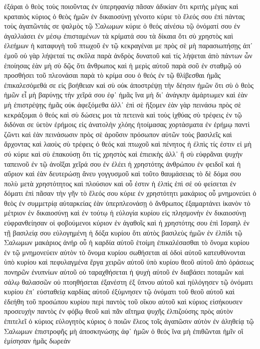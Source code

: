 ἐξάραι ὁ θεὸς τοὺς ποιοῦντας ἐν ὑπερηφανίᾳ πᾶσαν ἀδικίαν ὅτι κριτὴς μέγας καὶ κραταιὸς κύριος ὁ θεὸς ἡμῶν ἐν δικαιοσύνῃ
γένοιτο κύριε τὸ ἔλεός σου ἐπὶ πάντας τοὺς ἀγαπῶντάς σε
ψαλμὸς τῷ Σαλωμων
κύριε ὁ θεός αἰνέσω τῷ ὀνόματί σου ἐν ἀγαλλιάσει ἐν μέσῳ ἐπισταμένων τὰ κρίματά σου τὰ δίκαια
ὅτι σὺ χρηστὸς καὶ ἐλεήμων ἡ καταφυγὴ τοῦ πτωχοῦ ἐν τῷ κεκραγέναι με πρὸς σὲ μὴ παρασιωπήσῃς ἀπ᾽ ἐμοῦ
οὐ γὰρ λήψεταί τις σκῦλα παρὰ ἀνδρὸς δυνατοῦ καὶ τίς λήψεται ἀπὸ πάντων ὧν ἐποίησας ἐὰν μὴ σὺ δῷς
ὅτι ἄνθρωπος καὶ ἡ μερὶς αὐτοῦ παρὰ σοῦ ἐν σταθμῷ οὐ προσθήσει τοῦ πλεονάσαι παρὰ τὸ κρίμα σου ὁ θεός
ἐν τῷ θλίβεσθαι ἡμᾶς ἐπικαλεσόμεθά σε εἰς βοήθειαν καὶ σὺ οὐκ ἀποστρέψῃ τὴν δέησιν ἡμῶν ὅτι σὺ ὁ θεὸς ἡμῶν εἶ
μὴ βαρύνῃς τὴν χεῖρά σου ἐφ᾽ ἡμᾶς ἵνα μὴ δι᾽ ἀνάγκην ἁμάρτωμεν
καὶ ἐὰν μὴ ἐπιστρέψῃς ἡμᾶς οὐκ ἀφεξόμεθα ἀλλ᾽ ἐπὶ σὲ ἥξομεν
ἐὰν γὰρ πεινάσω πρὸς σὲ κεκράξομαι ὁ θεός καὶ σὺ δώσεις μοι
τὰ πετεινὰ καὶ τοὺς ἰχθύας σὺ τρέφεις ἐν τῷ διδόναι σε ὑετὸν ἐρήμοις εἰς ἀνατολὴν χλόης
ἡτοίμασας χορτάσματα ἐν ἐρήμῳ παντὶ ζῶντι καὶ ἐὰν πεινάσωσιν πρὸς σὲ ἀροῦσιν πρόσωπον αὐτῶν
τοὺς βασιλεῖς καὶ ἄρχοντας καὶ λαοὺς σὺ τρέφεις ὁ θεός καὶ πτωχοῦ καὶ πένητος ἡ ἐλπὶς τίς ἐστιν εἰ μὴ σύ κύριε
καὶ σὺ ἐπακούσῃ ὅτι τίς χρηστὸς καὶ ἐπιεικὴς ἀλλ᾽ ἢ σὺ εὐφρᾶναι ψυχὴν ταπεινοῦ ἐν τῷ ἀνοῖξαι χεῖρά σου ἐν ἐλέει
ἡ χρηστότης ἀνθρώπου ἐν φειδοῖ καὶ ἡ αὔριον καὶ ἐὰν δευτερώσῃ ἄνευ γογγυσμοῦ καὶ τοῦτο θαυμάσειας
τὸ δὲ δόμα σου πολὺ μετὰ χρηστότητος καὶ πλούσιον καὶ οὗ ἐστιν ἡ ἐλπὶς ἐπὶ σέ οὐ φείσεται ἐν δόματι
ἐπὶ πᾶσαν τὴν γῆν τὸ ἔλεός σου κύριε ἐν χρηστότητι
μακάριος οὗ μνημονεύει ὁ θεὸς ἐν συμμετρίᾳ αὐταρκείας ἐὰν ὑπερπλεονάσῃ ὁ ἄνθρωπος ἐξαμαρτάνει
ἱκανὸν τὸ μέτριον ἐν δικαιοσύνῃ καὶ ἐν τούτῳ ἡ εὐλογία κυρίου εἰς πλησμονὴν ἐν δικαιοσύνῃ
εὐφρανθείησαν οἱ φοβούμενοι κύριον ἐν ἀγαθοῖς καὶ ἡ χρηστότης σου ἐπὶ Ισραηλ ἐν τῇ βασιλείᾳ σου
εὐλογημένη ἡ δόξα κυρίου ὅτι αὐτὸς βασιλεὺς ἡμῶν
ἐν ἐλπίδι τῷ Σαλωμων
μακάριος ἀνήρ οὗ ἡ καρδία αὐτοῦ ἑτοίμη ἐπικαλέσασθαι τὸ ὄνομα κυρίου ἐν τῷ μνημονεύειν αὐτὸν τὸ ὄνομα κυρίου σωθήσεται
αἱ ὁδοὶ αὐτοῦ κατευθύνονται ὑπὸ κυρίου καὶ πεφυλαγμένα ἔργα χειρῶν αὐτοῦ ὑπὸ κυρίου θεοῦ αὐτοῦ
ἀπὸ ὁράσεως πονηρῶν ἐνυπνίων αὐτοῦ οὐ ταραχθήσεται ἡ ψυχὴ αὐτοῦ ἐν διαβάσει ποταμῶν καὶ σάλῳ θαλασσῶν οὐ πτοηθήσεται
ἐξανέστη ἐξ ὕπνου αὐτοῦ καὶ ηὐλόγησεν τῷ ὀνόματι κυρίου ἐπ᾽ εὐσταθείᾳ καρδίας αὐτοῦ ἐξύμνησεν τῷ ὀνόματι τοῦ θεοῦ αὐτοῦ
καὶ ἐδεήθη τοῦ προσώπου κυρίου περὶ παντὸς τοῦ οἴκου αὐτοῦ καὶ κύριος εἰσήκουσεν προσευχὴν παντὸς ἐν φόβῳ θεοῦ
καὶ πᾶν αἴτημα ψυχῆς ἐλπιζούσης πρὸς αὐτὸν ἐπιτελεῖ ὁ κύριος εὐλογητὸς κύριος ὁ ποιῶν ἔλεος τοῖς ἀγαπῶσιν αὐτὸν ἐν ἀληθείᾳ
τῷ Σαλωμων ἐπιστροφῆς
μὴ ἀποσκηνώσῃς ἀφ᾽ ἡμῶν ὁ θεός ἵνα μὴ ἐπιθῶνται ἡμῖν οἳ ἐμίσησαν ἡμᾶς δωρεάν
